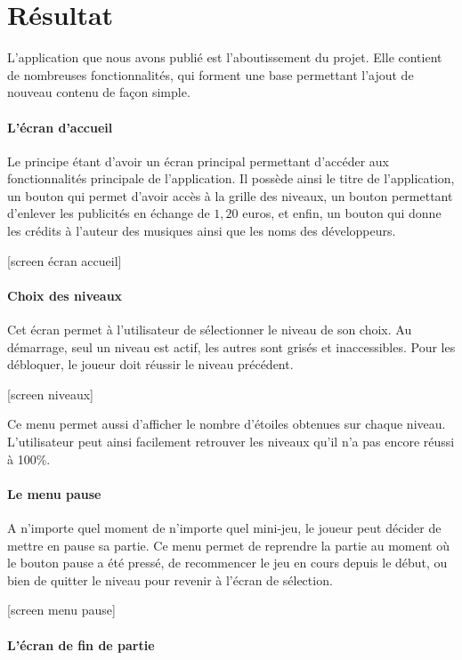 \section{Résultat}

L'application que nous avons publié est l'aboutissement du projet. Elle contient de nombreuses fonctionnalités, qui forment une base permettant l'ajout de nouveau contenu de façon simple.

\paragraph{L'écran d'accueil} Le principe étant d'avoir un écran principal permettant d'accéder aux fonctionnalités principale de l'application. Il possède ainsi le titre de l'application, un bouton qui permet d'avoir accès à la grille des niveaux, un bouton permettant d'enlever les publicités en échange de $1,20$ euros, et enfin, un bouton qui donne les crédits à l'auteur des musiques ainsi que les noms des développeurs.

[screen écran accueil]

\paragraph{Choix des niveaux} Cet écran permet à l'utilisateur de sélectionner le niveau de son choix. Au démarrage, seul un niveau est actif, les autres sont grisés et inaccessibles. Pour les débloquer, le joueur doit réussir le niveau précédent.

[screen niveaux]

Ce menu permet aussi d'afficher le nombre d'étoiles obtenues sur chaque niveau. L'utilisateur peut ainsi facilement retrouver les niveaux qu'il n'a pas encore réussi à 100\%.

\paragraph{Le menu pause}

A n'importe quel moment de n'importe quel mini-jeu, le joueur peut décider de mettre en pause sa partie. Ce menu permet de reprendre la partie au moment où le bouton pause a été pressé, de recommencer le jeu en cours depuis le début, ou bien de quitter le niveau pour revenir à l'écran de sélection.

[screen menu pause]

\paragraph{L'écran de fin de partie}

